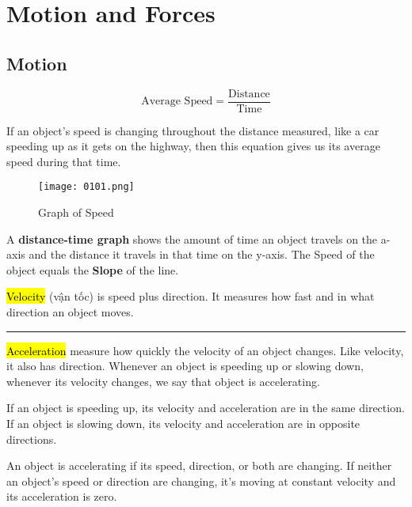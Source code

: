 \chapter{Motion and Forces}

\section{Motion}

\begin{tcolorbox}[colback=red!5!white,colframe=red!75!black]
  \[\text{Average Speed}=\frac{\text{Distance}}{\text{Time}}\]
\end{tcolorbox}

If an object’s speed is changing throughout the distance measured, like a car speeding up as it gets on the highway, then this equation gives us its average speed during that time.

\vspace{.3cm}

\begin{figure}[htb!]
  \centering
  \texttt{[image: 0101.png]}
  \caption{Graph of Speed}
\end{figure}

A \textbf{distance-time graph} shows the amount of time an object travels on the a-axis and the distance it travels in that time on the y-axis. The Speed of the object equals the \textbf{Slope} of the line.

\vspace{.5cm}

\hl{Velocity} (vận tốc) is speed plus direction. It measures how fast and in what direction an object moves.

\noindent\rule{\textwidth}{0.4pt}

\hl{Acceleration} measure how quickly the velocity of an object changes. Like velocity, it also has direction. Whenever an object is speeding up or slowing down, whenever its velocity changes, we say that object is accelerating.

If an object is speeding up, its velocity and acceleration are in the same direction. If an object is slowing down, its velocity and acceleration are in opposite directions.

An object is accelerating if its speed, direction, or both are changing. If neither an object's speed or direction are changing, it's moving at constant velocity and its acceleration is zero.

